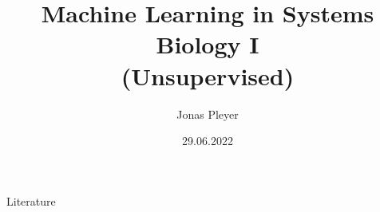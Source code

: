 \documentclass[10pt, compress, handout]{beamer}
\title{Machine Learning in Systems Biology I\\(Unsupervised)}
\subtitle{}
\date{29.06.2022}
\author{Jonas Pleyer}
\institute{Freiburg Center for Data Analysis and Modeling (FDM)}
\begin{document}
\maketitle







\begin{frame}{Literature}
    
    
\end{frame}
% 
%
\end{document}
